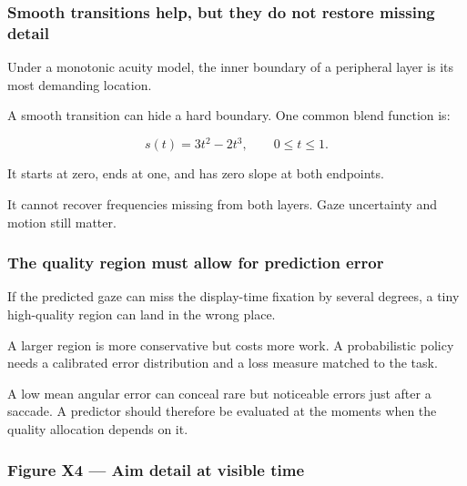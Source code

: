 \subsubsection{Smooth transitions help, but they do not restore missing detail}\label{04-visual-computing-ii-ch042-smooth-transitions-help-but-they-do-not-restore-missing-detail}

\hypertarget{04-visual-computing-ii-ch042-smooth-transitions-help-but-they-do-not-restore-missing-detail}{}

Under a monotonic acuity model, the inner boundary of a peripheral layer is its most demanding location.

A smooth transition can hide a hard boundary. One common blend function is:

\[
s(t)=3t^2-2t^3,\qquad 0\leq t\leq1.
\]

It starts at zero, ends at one, and has zero slope at both endpoints.

It cannot recover frequencies missing from both layers. Gaze uncertainty and motion still matter.

\subsubsection{The quality region must allow for prediction error}\label{04-visual-computing-ii-ch042-the-quality-region-must-allow-for-prediction-error}

\hypertarget{04-visual-computing-ii-ch042-the-quality-region-must-allow-for-prediction-error}{}

If the predicted gaze can miss the display-time fixation by several degrees, a tiny high-quality region can land in the wrong place.

A larger region is more conservative but costs more work. A probabilistic policy needs a calibrated error distribution and a loss measure matched to the task.

A low mean angular error can conceal rare but noticeable errors just after a saccade. A predictor should therefore be evaluated at the moments when the quality allocation depends on it.

\subsubsection{Figure X4 --- Aim detail at visible time}\label{04-visual-computing-ii-ch042-figure-x4-aim-detail-at-visible-time}

\hypertarget{04-visual-computing-ii-ch042-figure-x4-aim-detail-at-visible-time}{}


